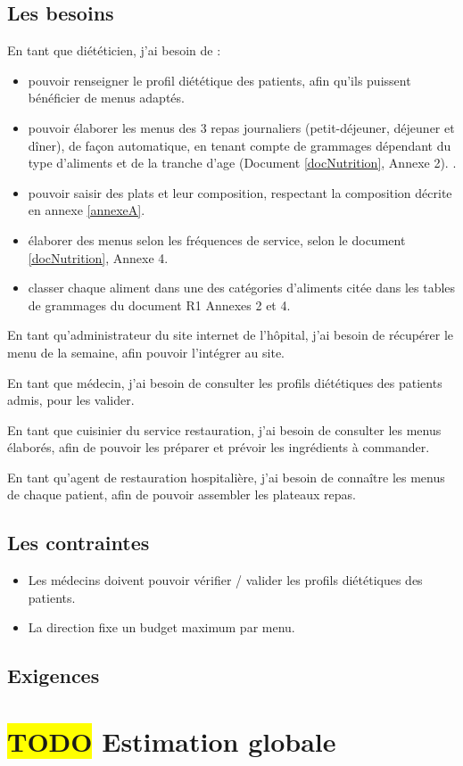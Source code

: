 \subsection{Les besoins}
En tant que diététicien, j’ai besoin de :
\begin{itemize}
 \item pouvoir renseigner le profil diététique des patients, afin qu’ils puissent bénéficier de menus adaptés.
 \item pouvoir élaborer les menus des 3 repas journaliers (petit-déjeuner, déjeuner et dîner), de façon automatique, en tenant compte de  grammages dépendant du type d'aliments et de la tranche d'age (Document \ref{docNutrition}, Annexe 2). .
 \item pouvoir saisir des plats et leur composition, respectant la composition décrite en annexe \ref{annexeA}.
 \item élaborer des menus selon les fréquences de service, selon le document \ref{docNutrition}, Annexe 4.
 \item classer chaque aliment dans une des catégories d’aliments citée dans les tables de grammages du document R1 Annexes 2 et 4.
\end{itemize}
En tant qu’administrateur du site internet de l’hôpital, j’ai besoin de récupérer le menu de la semaine, afin pouvoir l’intégrer au site.

En tant que médecin, j’ai besoin de consulter les profils diététiques des patients admis, pour les  valider.

En tant que cuisinier du service restauration, j’ai besoin de consulter les menus élaborés, afin de pouvoir les préparer et prévoir les ingrédients à commander.

En tant qu’agent de restauration hospitalière,  j’ai besoin de connaître les menus de chaque patient, afin de pouvoir assembler les plateaux repas.

\subsection{Les contraintes}
\begin{itemize}
\item Les médecins doivent pouvoir vérifier / valider les profils diététiques des patients.
\item La direction fixe un budget maximum par menu.
\end{itemize}

\subsection{Exigences}



\section{\colorbox{yellow}{TODO} Estimation globale}
